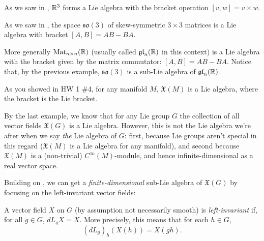 \begin{example}
	As we saw in , $\mathbb{R}^3$ forms a Lie algebra with the bracket operation $[v,w] = v \times w$.
\end{example}

\begin{example}
	As we saw in , the space $\mathfrak{so}(3)$ of skew-symmetric $3 \times 3$ matrices is a Lie algebra with bracket $[A,B] = AB-BA$.
\end{example}

\begin{example}
	More generally $\operatorname{Mat}_{n \times n} (\mathbb{R})$ (usually called $\mathfrak{gl}_n(\mathbb{R})$ in this context) is a Lie algebra with the bracket given by the matrix commutator: $[A,B] = AB-BA$. Notice that, by the previous example, $\mathfrak{so}(3)$ is a sub-Lie algebra of $\mathfrak{gl}_n(\mathbb{R})$.
\end{example}

\begin{example}
	As you showed in HW 1 \#4, for any manifold $M$, $\mathfrak{X}(M)$ is a Lie algebra, where the bracket is the Lie bracket.
\end{example}

By the last example, we know that for any Lie group $G$ the collection of all vector fields $\mathfrak{X}(G)$ is a Lie algebra. However, this is not the Lie algebra we're after when we say \emph{the} Lie algebra of $G$: first, because Lie groups aren't special in this regard ($\mathfrak{X}(M)$ is a Lie algebra for any manifold), and second because $\mathfrak{X}(M)$ is a (non-trivial) $C^\infty(M)$-module, and hence infinite-dimensional as a real vector space. 

Building on , we can get a \emph{finite-dimensional} sub-Lie algebra of $\mathfrak{X}(G)$ by focusing on the left-invariant vector fields:

\begin{definition}\label{def:left-invariant}
	A vector field $X$ on $G$ (by assumption not necessarily smooth) is \emph{left-invariant} if, for all $g \in G$, $dL_gX = X$. More precisely, this means that for each $h \in G$,
	\[
		\left(dL_g\right)_h (X(h)) = X(gh).
	\]
\end{definition}

